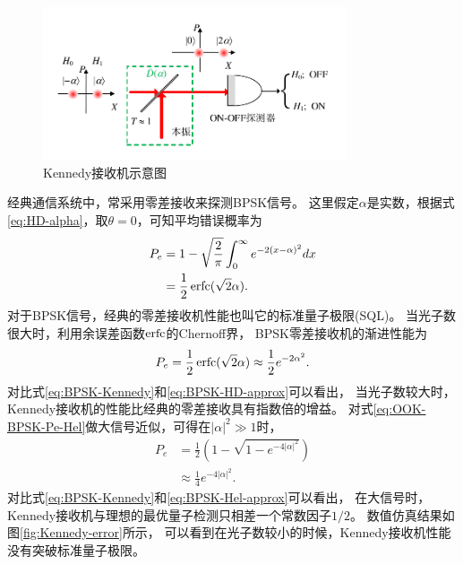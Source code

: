 \begin{figure}
\centering
  \includegraphics[width=0.8\textwidth]{figures/chap2/Kennedy-receiver}
  \caption{Kennedy接收机示意图}
  \label{fig:kennedy-receiver}
\end{figure}


经典通信系统中，常采用零差接收来探测BPSK信号。
这里假定$\alpha$是实数，根据式\ref{eq:HD-alpha}，取$\theta=0$，可知平均错误概率为
\begin{equation}
\begin{split}
P_e & = 1 -\sqrt{\frac{2}{\pi}}\int_0^{\infty} e^{-2(x - \alpha)^2} dx \\
    & = \frac{1}{2}\operatorname{erfc}(\sqrt{2}\alpha).
\end{split}
\end{equation}
对于BPSK信号，经典的零差接收机性能也叫它的标准量子极限(SQL)。
当光子数很大时，利用余误差函数$\operatorname{erfc}$的Chernoff界\cite{chang2011chernoff}，
BPSK零差接收机的渐进性能为
\begin{equation}
P_e = \frac{1}{2}\operatorname{erfc}(\sqrt{2}\alpha) \approx \frac{1}{2} e^{-2\alpha^2}.
\label{eq:BPSK-HD-approx}
\end{equation}
对比式\ref{eq:BPSK-Kennedy}和\ref{eq:BPSK-HD-approx}可以看出，
当光子数较大时，Kennedy接收机的性能比经典的零差接收具有指数倍的增益。
对式\ref{eq:OOK-BPSK-Pe-Hel}做大信号近似，可得在$|\alpha|^2 \gg 1$时，
\begin{equation}
\begin{split}
P_e &= \frac{1}{2} (1 - \sqrt{1 - e^{-4|\alpha|^2}}) \\
    &\approx \frac{1}{4} e^{-4|\alpha|^2}.
\label{eq:BPSK-Hel-approx}
\end{split}
\end{equation}
对比式\ref{eq:BPSK-Kennedy}和\ref{eq:BPSK-Hel-approx}可以看出，
在大信号时，Kennedy接收机与理想的最优量子检测只相差一个常数因子$1/2$。
数值仿真结果如图\ref{fig:Kennedy-error}所示，
可以看到在光子数较小的时候，Kennedy接收机性能没有突破标准量子极限。


